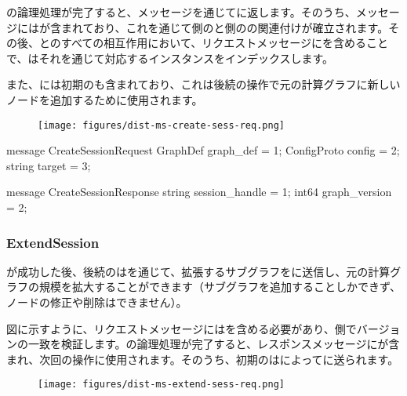 \begin{content}
の論理処理が完了すると、メッセージを通じてに返します。そのうち、メッセージにはが含まれており、これを通じて側のと側のの関連付けが確立されます。その後、とのすべての相互作用において、リクエストメッセージにを含めることで、はそれを通じて対応するインスタンスをインデックスします。

また、には初期のも含まれており、これは後続の操作で元の計算グラフに新しいノードを追加するために使用されます。

\begin{figure}[H]
\centering
\texttt{[image: figures/dist-ms-create-sess-req.png]}
\caption{}
 \label{fig:dist-ms-create-sess-req}
\end{figure}

\begin{leftbar}
\begin{c++}
message CreateSessionRequest {
  GraphDef graph_def = 1;
  ConfigProto config = 2;
  string target = 3;
}

message CreateSessionResponse {
  string session_handle = 1;
  int64 graph_version = 2;
}
\end{c++}
\end{leftbar}

\subsubsection{ExtendSession}

が成功した後、後続のはを通じて、拡張するサブグラフをに送信し、元の計算グラフの規模を拡大することができます（サブグラフを追加することしかできず、ノードの修正や削除はできません）。

図に示すように、リクエストメッセージにはを含める必要があり、側でバージョンの一致を検証します。の論理処理が完了すると、レスポンスメッセージにが含まれ、次回の操作に使用されます。そのうち、初期のはによってに送られます。

\begin{figure}[H]
\centering
\texttt{[image: figures/dist-ms-extend-sess-req.png]}
\caption{}
 \label{fig:dist-ms-extend-sess-req}
\end{figure}


\end{content}
